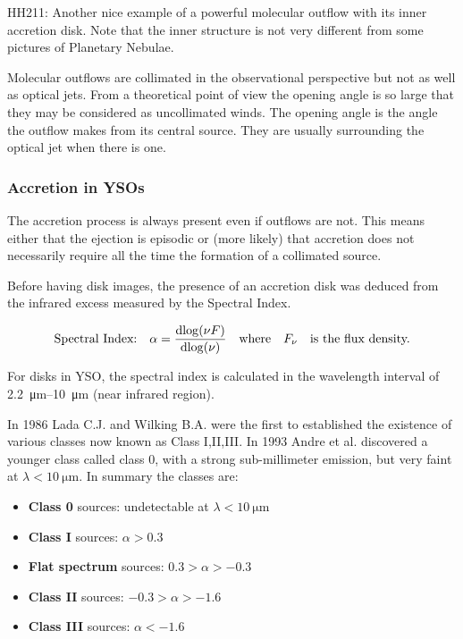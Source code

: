\documentclass[10pt,a4paper,english]{article}
\begin{document}
HH211: Another nice example of a powerful molecular outflow with its inner
accretion disk. Note that the inner structure is not very different from some
pictures of Planetary Nebulae.

Molecular outflows are collimated in the observational perspective but not as
well as optical jets. From a theoretical point of view the opening angle is so
large that they may be considered as uncollimated winds. The opening angle is
the angle the outflow makes from its central source. They are usually
surrounding the optical jet when there is one.

\subsubsection{Accretion in YSOs}

The accretion process is always present even if outflows are not. This means
either that the ejection is episodic or (more likely) that accretion does not
necessarily require all the time the formation of a collimated source.

Before having disk images, the presence of an accretion disk was deduced from
the infrared excess measured by the Spectral Index.

\[
    \text{Spectral Index:}\quad \alpha=\frac{\mathrm{d}{\log(\nu F)}}{\mathrm{d}{
    \log(\nu)}}\quad\text{where}\quad F_{\nu}\quad\text{is the flux density.}
\]


For disks in YSO, the spectral index is calculated in the wavelength interval
of \SIrange{2.2}{10}{\um} (near infrared region).

In 1986 Lada C.J. and Wilking B.A. were the first to established the existence
of various classes now known as Class I,II,III. In 1993 Andre et al. discovered
a younger class called class 0, with a strong sub-millimeter emission, but very
faint at $\lambda<\SI{10}{\um}$. In summary the classes are:
\begin{itemize}
    \item \textbf{Class 0} sources: undetectable at $\lambda<\SI{10}{\um}$
    \item \textbf{Class I} sources: $\alpha>0.3$
    \item \textbf{Flat spectrum} sources: $0.3>\alpha>-0.3$
    \item \textbf{Class II} sources: $-0.3>\alpha>-1.6$
    \item \textbf{Class III} sources: $\alpha<-1.6$
\end{itemize}
\end{document}
